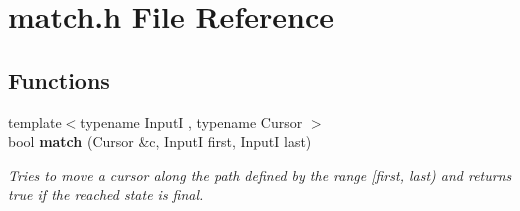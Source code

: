 \section{match.\+h File Reference}
\label{match_8h}
\subsection*{Functions}
\begin{DoxyCompactItemize}
\item 
{\footnotesize template$<$typename Input\+I , typename Cursor $>$ }\\bool {\bfseries match} (Cursor \&c, Input\+I first, Input\+I last)
\begin{DoxyCompactList}\small\item\em Tries to move a cursor along the path defined by the range {\ttfamily  [first, last) } and returns {\ttfamily true} if the reached state is final. \end{DoxyCompactList}\end{DoxyCompactItemize}
